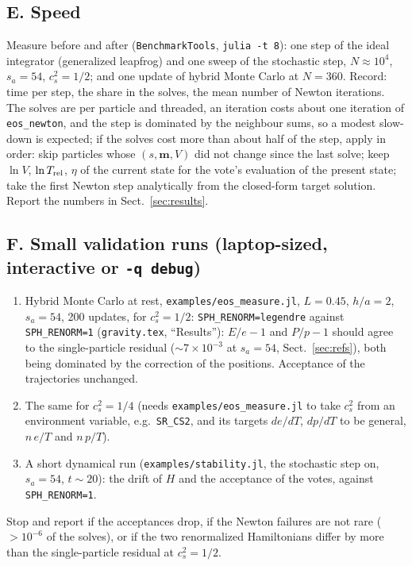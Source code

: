 \documentclass[11pt,aps,preprint,nofootinbib,superscriptaddress,tightenlines]{revtex4-2}
\def\Sect#1{Sect.~\ref{#1}}
\begin{document}
\subsection{E. Speed}
\label{sec:speed}

Measure before and after (\texttt{BenchmarkTools}, \texttt{julia -t 8}): one step of the ideal integrator (generalized leapfrog) and one sweep of the stochastic
step, $N\approx10^4$, $s_a=54$, $c_s^2=1/2$; and one update of hybrid Monte Carlo at $N=360$.  Record: time per step, the share in the solves, the mean
number of Newton iterations.  The solves are per particle and threaded, an iteration costs about one iteration of \texttt{eos\_newton}, and the step is
dominated by the neighbour sums, so a modest slow-down is expected; if the solves cost more than about half of the step, apply in order: skip particles
whose $(s,\bm m,V)$ did not change since the last solve; keep $\ln V$, $\ln T_{\rm rel}$, $\eta$ of the current state for the vote's evaluation of the present
state; take the first Newton step analytically from the closed-form target solution.  Report the numbers in \Sect{sec:results}.

\subsection{F. Small validation runs (laptop-sized, interactive or \texttt{-q debug})}
\label{sec:smoke}

\begin{enumerate}
\item Hybrid Monte Carlo at rest, \nolinkurl{examples/eos_measure.jl}, $L=0.45$, $h/a=2$, $s_a=54$, 200 updates, for $c_s^2=1/2$: \texttt{SPH\_RENORM=legendre}
  against \texttt{SPH\_RENORM=1} (\nolinkurl{gravity.tex}, ``Results''): $E/e-1$ and $P/p-1$ should agree to the single-particle residual
  ($\sim7\times10^{-3}$ at $s_a=54$, \Sect{sec:refs}), both being dominated by the correction of the positions.  Acceptance of the trajectories unchanged.
\item The same for $c_s^2=1/4$ (needs \nolinkurl{examples/eos_measure.jl} to take $c_s^2$ from an environment variable, e.g.\ \texttt{SR\_CS2}, and its
  targets $de/dT$, $dp/dT$ to be general, $n\,e/T$ and $n\,p/T$).
\item A short dynamical run (\nolinkurl{examples/stability.jl}, the stochastic step on, $s_a=54$, $t\sim20$): the drift of $H$ and the acceptance of the
  votes, against \texttt{SPH\_RENORM=1}.
\end{enumerate}
Stop and report if the acceptances drop, if the Newton failures are not rare ($>10^{-6}$ of the solves), or if the two renormalized Hamiltonians differ by
more than the single-particle residual at $c_s^2=1/2$.
\end{document}
